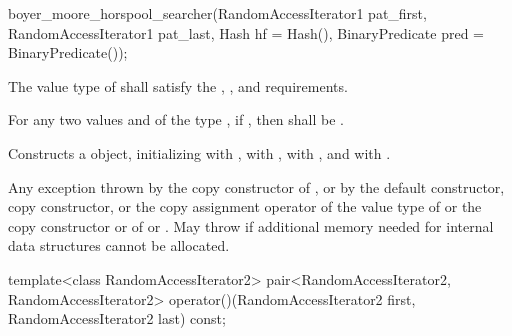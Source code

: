 %
\begin{itemdecl}
boyer_moore_horspool_searcher(RandomAccessIterator1 pat_first,
                              RandomAccessIterator1 pat_last,
                              Hash hf = Hash(),
                              BinaryPredicate pred = BinaryPredicate());
\end{itemdecl}

\begin{itemdescr}
\pnum
\requires
The value type of  shall satisfy the ,
, and  requirements.

\pnum
\requires
For any two values  and  of the type ,
if , then  shall be .

\pnum
\effects
Constructs a  object, initializing  with ,
 with ,  with , and  with .

\pnum
\throws
Any exception thrown by the copy constructor of ,
or by the default constructor, copy constructor, or the copy assignment operator of the value type of 
or the copy constructor or  of  or .
May throw  if additional memory needed for internal data structures cannot be allocated.
\end{itemdescr}

%
\begin{itemdecl}
template<class RandomAccessIterator2>
  pair<RandomAccessIterator2, RandomAccessIterator2>
    operator()(RandomAccessIterator2 first, RandomAccessIterator2 last) const;
\end{itemdecl}

